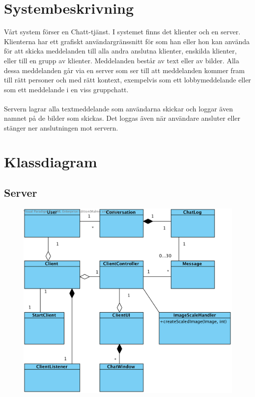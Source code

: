 \documentclass[a4paper,11pt]{article}
\begin{document}
\section{Systembeskrivning}

Vårt system förser en Chatt-tjänst. I systemet finns det klienter och en server. Klienterna har ett grafiskt användargränssnitt för som han eller hon kan använda för att skicka meddelanden till alla andra anslutna klienter, enskilda klienter, eller till en grupp av klienter. Meddelanden består av text eller av bilder. Alla dessa meddelanden går via en server som ser till att meddelanden kommer fram till rätt personer och med rätt kontext, exempelvis som ett lobbymeddelande eller som ett meddelande i en viss gruppchatt.
\\
\\
Servern lagrar alla textmeddelande som användarna skickar och loggar även namnet på de bilder som skickas. Det loggas även när användare ansluter eller stänger ner anslutningen mot servern.

\section{Klassdiagram}
\subsection{Server}
	\begin{figure}[H]
		\centering
		\includegraphics[width=\textwidth]{diagram/Client.png}

	\end{figure}
\end{document}
